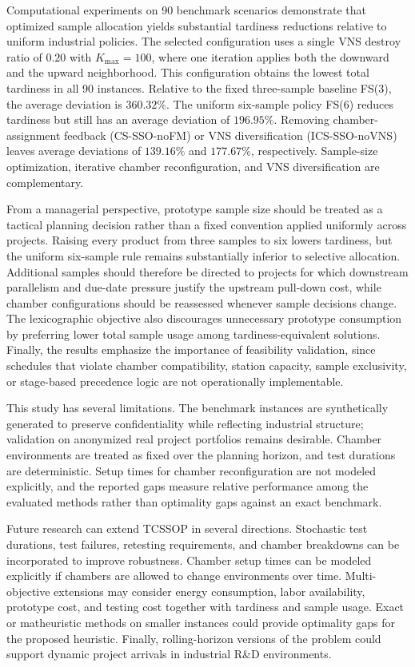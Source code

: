 \documentclass[11pt]{article}
\begin{document}
Computational experiments on 90 benchmark scenarios demonstrate that optimized sample allocation yields substantial tardiness reductions relative to uniform industrial policies. The selected configuration uses a single VNS destroy ratio of \(0.20\) with \(K_{\max}=100\), where one iteration applies both the downward and the upward neighborhood. This configuration obtains the lowest total tardiness in all 90 instances. Relative to the fixed three-sample baseline FS(3), the average deviation is \(360.32\%\). The uniform six-sample policy FS(6) reduces tardiness but still has an average deviation of \(196.95\%\). Removing chamber-assignment feedback (CS-SSO-noFM) or VNS diversification (ICS-SSO-noVNS) leaves average deviations of \(139.16\%\) and \(177.67\%\), respectively. Sample-size optimization, iterative chamber reconfiguration, and VNS diversification are complementary.

From a managerial perspective, prototype sample size should be treated as a tactical planning decision rather than a fixed convention applied uniformly across projects. Raising every product from three samples to six lowers tardiness, but the uniform six-sample rule remains substantially inferior to selective allocation. Additional samples should therefore be directed to projects for which downstream parallelism and due-date pressure justify the upstream pull-down cost, while chamber configurations should be reassessed whenever sample decisions change. The lexicographic objective also discourages unnecessary prototype consumption by preferring lower total sample usage among tardiness-equivalent solutions. Finally, the results emphasize the importance of feasibility validation, since schedules that violate chamber compatibility, station capacity, sample exclusivity, or stage-based precedence logic are not operationally implementable.

This study has several limitations. The benchmark instances are synthetically generated to preserve confidentiality while reflecting industrial structure; validation on anonymized real project portfolios remains desirable. Chamber environments are treated as fixed over the planning horizon, and test durations are deterministic. Setup times for chamber reconfiguration are not modeled explicitly, and the reported gaps measure relative performance among the evaluated methods rather than optimality gaps against an exact benchmark.

Future research can extend TCSSOP in several directions. Stochastic test durations, test failures, retesting requirements, and chamber breakdowns can be incorporated to improve robustness. Chamber setup times can be modeled explicitly if chambers are allowed to change environments over time. Multi-objective extensions may consider energy consumption, labor availability, prototype cost, and testing cost together with tardiness and sample usage. Exact or matheuristic methods on smaller instances could provide optimality gaps for the proposed heuristic. Finally, rolling-horizon versions of the problem could support dynamic project arrivals in industrial R\&D environments.



\end{document}
